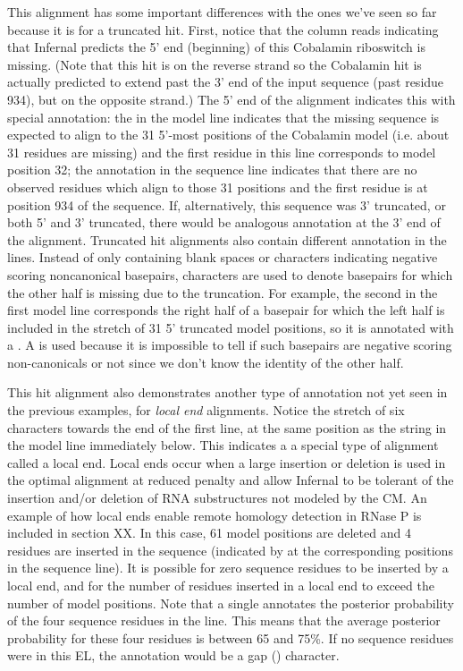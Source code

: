This alignment has some important differences with the ones we've seen
so far because it is for a truncated hit. First, notice that the
 column reads  indicating that Infernal
predicts the 5' end (beginning) of this Cobalamin riboswitch is
missing. (Note that this hit is on the reverse strand so the Cobalamin
hit is actually predicted to extend past the 3' end of the input
sequence (past residue 934), but on the opposite strand.) The 5' end
of the alignment indicates this with special annotation: the
\ccode{<[31]*} in the model line indicates that the missing sequence
is expected to align to the 31 5'-most positions of the Cobalamin
model (i.e. about 31 residues are missing) and the first 
residue in this line corresponds to model position 32; the \ccode{<[
0]*} annotation in the sequence line indicates that there are no
observed residues which align to those 31 positions and the first
 residue is at position 934 of the sequence. If,
alternatively, this sequence was 3' truncated, or both 5' and 3'
truncated, there would be analogous annotation at the 3' end of the
alignment. Truncated hit alignments also contain different annotation
in the  lines. Instead of only containing blank spaces or
 characters indicating negative scoring noncanonical
basepairs,  characters are used to denote basepairs for which
the other half is missing due to the truncation. For example, the
second  in the first model line corresponds the right half of
a basepair for which the left half is included in the stretch of 31 5'
truncated model positions, so it is annotated with a .  A
 is used because it is impossible to tell if such basepairs
are negative scoring non-canonicals or not since we don't know the
identity of the other half.

This hit alignment also demonstrates another type of annotation not
yet seen in the previous examples, for \emph{local end}
alignments. Notice the stretch of six \ccode{~} characters towards the
end of the first  line, at the same position as the string
\ccode{*[61]*} in the model line immediately below. This indicates a
a special type of alignment called a local end. Local ends occur when
a large insertion or deletion is used in the optimal alignment at
reduced penalty \cite{KleinEddy03} and allow Infernal to be tolerant
of the insertion and/or deletion of RNA substructures not modeled by the
CM. An example of how local ends enable remote homology detection in
RNase P is included in section XX. In this case, 61 model positions
are deleted and 4 residues are inserted in the sequence (indicated by 
\ccode{*[ 4]*} at the corresponding positions in the sequence line). 
It is possible for zero sequence residues to be inserted by a local
end, and for the number of residues inserted in a local end to exceed the
number of model positions. Note that a single  annotates the
posterior probability of the four sequence residues in the 
line. This means that the average posterior probability for these four
residues is between 65 and 75\%. If no sequence residues were in this
EL, the  annotation would be a gap () character.

